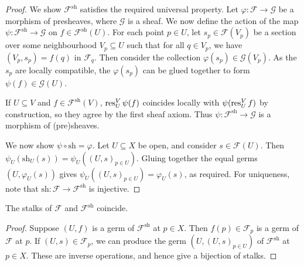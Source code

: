 \begin{proof}
    We show \( \mathcal F^{\mathrm{sh}} \) satisfies the required universal property.
    Let \( \varphi : \mathcal F \to \mathcal G \) be a morphism of presheaves, where \( \mathcal G \) is a sheaf.
    We now define the action of the map \( \psi : \mathcal F^{\mathrm{sh}} \to \mathcal G \) on \( f \in \mathcal F^{\mathrm{sh}}(U) \).
    For each point \( p \in U \), let \( s_p \in \mathcal F(V_p) \) be a section over some neighbourhood \( V_p \subseteq U \) such that for all \( q \in V_p \), we have \( (V_p, s_p) = f(q) \) in \( \mathcal F_q \).
    Then consider the collection \( \varphi(s_p) \in \mathcal G(V_p) \).
    As the \( s_p \) are locally compatible, the \( \varphi(s_p) \) can be glued together to form \( \psi(f) \in \mathcal G(U) \).

    If \( U \subseteq V \) and \( f \in \mathcal F^{\mathrm{sh}}(V) \), \( \operatorname{res}_U^V \psi(f) \) coincides locally with \( \psi(\operatorname{res}_U^V f) \) by construction, so they agree by the first sheaf axiom.
    Thus \( \psi : \mathcal F^{\mathrm{sh}} \to \mathcal G \) is a morphism of (pre)sheaves.

    We now show \( \psi \circ \mathrm{sh} = \varphi \).
    Let \( U \subseteq X \) be open, and consider \( s \in \mathcal F(U) \).
    Then \( \psi_U(\mathrm{sh}_U(s)) = \psi_U((U, s)_{p \in U}) \).
    Gluing together the equal germs \( (U, \varphi_U(s)) \) gives \( \psi_U((U, s)_{p \in U}) = \varphi_U(s) \), as required.
    For uniqueness, note that \( \mathrm{sh} : \mathcal F \to \mathcal F^{\mathrm{sh}} \) is injective.
\end{proof}
\begin{corollary}
    The stalks of \( \mathcal F \) and \( \mathcal F^{\mathrm{sh}} \) coincide.
\end{corollary}
\begin{proof}
    Suppose \( (U, f) \) is a germ of \( \mathcal F^{\mathrm{sh}} \) at \( p \in X \).
    Then \( f(p) \in \mathcal F_p \) is a germ of \( \mathcal F \) at \( p \).
    If \( (U, s) \in \mathcal F_p \), we can produce the germ \( (U, (U, s)_{p \in U}) \) of \( \mathcal F^{\mathrm{sh}} \) at \( p \in X \).
    These are inverse operations, and hence give a bijection of stalks.
\end{proof}

